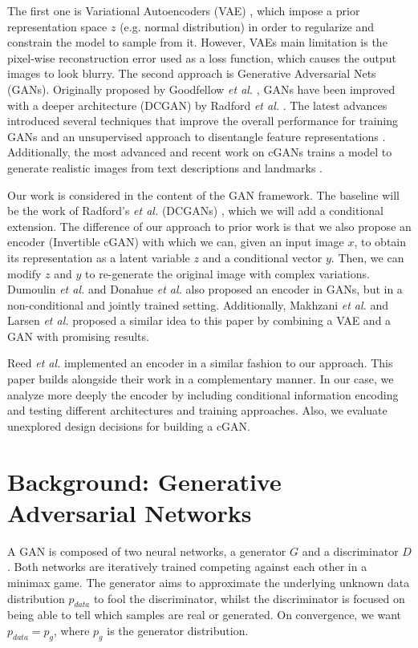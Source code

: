 \documentclass{article}
\begin{document}
The first one is Variational Autoencoders (VAE) \citep{Gregor2015,Kingma2013,Rezende2014,Kingma2014}, which impose a prior representation space $z$ (e.g. normal distribution) in order to regularize and constrain the model to sample from it.
However, VAEs main limitation is the pixel-wise reconstruction error used as a loss function, which causes the output images to look blurry.
The second approach is Generative Adversarial Nets (GANs). Originally proposed by Goodfellow \textit{et al.} \citep{Goodfellow2014}, GANs have been improved with a deeper architecture (DCGAN) by Radford \textit{et al.} \citep{Radford2015}. The latest advances introduced several techniques that improve the overall performance for training GANs \citep{Salimans2016} and an unsupervised approach to disentangle feature representations \citep{Chen2016}.
Additionally, the most advanced and recent work on cGANs trains a model to generate realistic images from text descriptions and landmarks \cite{Reed2016_2}.



Our work is considered in the content of the GAN framework. The baseline will be the work of Radford's \textit{et al.} (DCGANs) \citep{Radford2015}, which we will add a conditional extension. The difference of our approach to prior work is that we also propose an encoder (Invertible cGAN) with which we can, given an input image $x$, to obtain its representation as a latent variable $z$ and a conditional vector $y$. Then, we can modify $z$ and $y$ to re-generate the original image with complex variations. 
Dumoulin \textit{et al.} \citep{Dumoulin2016} and Donahue \textit{et al.} \citep{Donahue2016} also proposed an encoder in GANs, but in a non-conditional and jointly trained setting.
Additionally, Makhzani \textit{et al.} \citep{Makhzani2015} and Larsen \textit{et al.} \citep{Larsen2015} proposed a similar idea to this paper by combining a VAE and a GAN with promising results.

Reed \textit{et al.} \citep{Reed2016} implemented an encoder in a similar fashion to our approach. This paper builds alongside their work in a complementary manner. In our case, we analyze more deeply the encoder by including conditional information encoding and testing different architectures and training approaches. Also, we evaluate unexplored design decisions for building a cGAN. 
\section{Background: Generative Adversarial Networks} \label{sec:GANs}
A GAN is composed of two neural networks, a generator $G$ and a discriminator $D$. Both networks are iteratively trained competing against each other in a minimax game. The generator aims to approximate the underlying unknown data distribution $p_{data}$ to fool the discriminator, whilst the discriminator is focused on being able to tell which samples are real or generated. On convergence, we want $p_{data}=p_g$, where $p_g$ is the generator distribution. 
\end{document}
